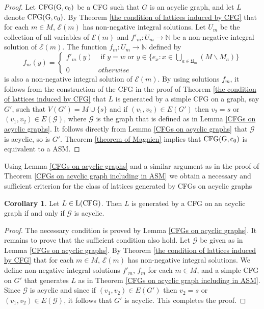 \documentclass{article}
\theoremstyle{definition}
\newtheorem{coro}{Corollary}
\newcommand\down[1]{e_{#1}}
\newcommand\set[1]{\{ #1 \}}
\begin{document}
\begin{proof}
Let ${\rm CFG(G,c_0)}$ be a CFG such that $G$ is an acyclic graph, and let $L$ denote ${\rm CFG(G,c_0)}$. By Theorem \ref{the condition of lattices induced by CFG} that for each $m \in M$, $\mathcal{E}(m)$ has non-negative integral solutions. Let $U_m$ be the collection of all variables of $\mathcal{E}(m)$ and ${f'}_m:U_m\to \mathbb{N}$ be a non-negative integral solution of $\mathcal{E}(m)$. The function $f_m:U_m\to \mathbb{N}$ defined by
$$
f_m(y)=\begin{cases}
{f'}_m(y)&\text{ if } y=w\text{ or } y\in \set{\down{x}: x\in \underset{a \in \mathfrak{U}_m}{\bigcup} (M\backslash M_a)}\\
0&otherwise
\end{cases}
$$
is also a non-negative integral solution of $\mathcal{E}(m)$. By using solutions $f_m$,  it follows from the construction of the CFG in the proof of Theorem \ref{the condition of lattices induced by CFG} that $L$ is generated by a simple CFG on a graph, say $G'$, such that $V(G')=M\cup \set{s}$ and if $(v_1,v_2) \in E(G')$ then $v_2=s$ or $(v_1,v_2) \in E(\mathcal{G})$, where $\mathcal{G}$ is the graph that is defined as in Lemma \ref{CFGs on acyclic graphs}. It follows directly from Lemma \ref{CFGs on acyclic graphs} that  $\mathcal{G}$ is acyclic, so is $G'$. Theorem \ref{theorem of Magnien} implies that ${\rm CFG(G,c_0)}$ is equivalent to a ASM.
\end{proof}
Using Lemma \ref{CFGs on acyclic graphs} and a similar argument as in the proof of Theorem \ref{CFGs on acyclic graph including in ASM} we obtain a necessary and sufficient criterion for the class of lattices generated by CFGs on acyclic graphs
\begin{coro}
Let $L \in {\rm L(CFG)}$. Then $L$ is generated by a CFG on an acyclic graph if and only if $\mathcal{G}$ is acyclic.
\end{coro}
\begin{proof}
The necessary condition is proved by Lemma \ref{CFGs on acyclic graphs}. It remains to prove that the sufficient condition also hold. Let $\mathcal{G}$ be given as in Lemma \ref{CFGs on acyclic graphs}. By Theorem \ref{the condition of lattices induced by CFG} that for each $m \in M$, $\mathcal{E}(m)$ has non-negative integral solutions. We define non-negative integral solutions $f'_m$, $f_m$ for each $m \in M$, and a simple CFG on $G'$ that generates $L$  as in Theorem \ref{CFGs on acyclic graph including in ASM}. Since $\mathcal{G}$ is acyclic  and since if $(v_1,v_2) \in E(G')$ then $v_2=s$ or $(v_1,v_2) \in E(\mathcal{G})$, it follows that $G'$ is acyclic. This completes the proof.
\end{proof}
\end{document}
